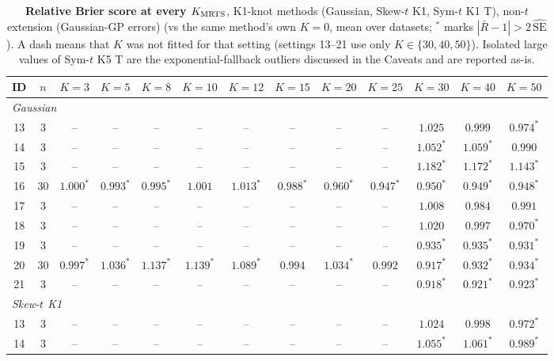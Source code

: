 \begin{table}[p]
\centering\footnotesize
\setlength{\tabcolsep}{3.5pt}
\caption{\textbf{Relative Brier score at every $K_{\mathrm{MRTS}}$}, K1-knot methods (Gaussian, Skew-$t$ K1, Sym-$t$ K1 T), non-$t$ extension (Gaussian-GP errors) (vs the same method's own $K=0$, mean over datasets; $^{*}$ marks $|\bar R - 1| > 2\,\widehat{\mathrm{SE}}$). A dash means that $K$ was not fitted for that setting (settings 13--21 use only $K \in \{30,40,50\}$). Isolated large values of Sym-$t$ K5 T are the exponential-fallback outliers discussed in the Caveats and are reported as-is.}
\label{tab:brierKc}
\begin{tabular}{ccccccccccccc}
\toprule
ID & $n$ & $K{=}3$ & $K{=}5$ & $K{=}8$ & $K{=}10$ & $K{=}12$ & $K{=}15$ & $K{=}20$ & $K{=}25$ & $K{=}30$ & $K{=}40$ & $K{=}50$ \\
\midrule
\multicolumn{13}{l}{\emph{Gaussian}} \\[1pt]
13 & 3 & -- & -- & -- & -- & -- & -- & -- & -- & $1.025$ & $0.999$ & $0.974^{*}$ \\
14 & 3 & -- & -- & -- & -- & -- & -- & -- & -- & $1.052^{*}$ & $1.059^{*}$ & $0.990$ \\
15 & 3 & -- & -- & -- & -- & -- & -- & -- & -- & $1.182^{*}$ & $1.172^{*}$ & $1.143^{*}$ \\
16 & 30 & $1.000^{*}$ & $0.993^{*}$ & $0.995^{*}$ & $1.001$ & $1.013^{*}$ & $0.988^{*}$ & $0.960^{*}$ & $0.947^{*}$ & $0.950^{*}$ & $0.949^{*}$ & $0.948^{*}$ \\
17 & 3 & -- & -- & -- & -- & -- & -- & -- & -- & $1.008$ & $0.984$ & $0.991$ \\
18 & 3 & -- & -- & -- & -- & -- & -- & -- & -- & $1.020$ & $0.997$ & $0.970^{*}$ \\
19 & 3 & -- & -- & -- & -- & -- & -- & -- & -- & $0.935^{*}$ & $0.935^{*}$ & $0.931^{*}$ \\
20 & 30 & $0.997^{*}$ & $1.036^{*}$ & $1.137^{*}$ & $1.139^{*}$ & $1.089^{*}$ & $0.994$ & $1.034^{*}$ & $0.992$ & $0.917^{*}$ & $0.932^{*}$ & $0.934^{*}$ \\
21 & 3 & -- & -- & -- & -- & -- & -- & -- & -- & $0.918^{*}$ & $0.921^{*}$ & $0.923^{*}$ \\
\midrule
\multicolumn{13}{l}{\emph{Skew-$t$ K1}} \\[1pt]
13 & 3 & -- & -- & -- & -- & -- & -- & -- & -- & $1.024$ & $0.998$ & $0.972^{*}$ \\
14 & 3 & -- & -- & -- & -- & -- & -- & -- & -- & $1.055^{*}$ & $1.061^{*}$ & $0.989^{*}$ \\

\end{tabular}
\end{table}
